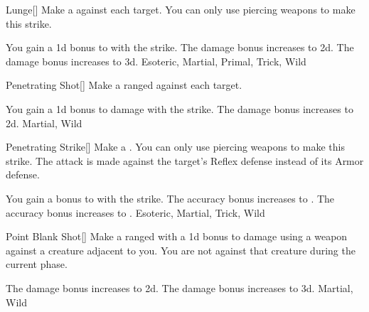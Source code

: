 \lowercase{\hypertarget{maneuver:Lunge}{}}\label{maneuver:Lunge}
\hypertarget{maneuver:Lunge}{}
\begin{freeability}[Rank 1]{Lunge}[]
Make a  against each target.
You can only use piercing weapons to make this strike.

\rankline
{} You gain a \plus1d bonus to  with the strike.
 The damage bonus increases to \plus2d.
 The damage bonus increases to \plus3d.
 Esoteric, Martial, Primal, Trick, Wild
\end{freeability}
\vspace{0.25em}



\lowercase{\hypertarget{maneuver:Penetrating Shot}{}}\label{maneuver:Penetrating Shot}
\hypertarget{maneuver:Penetrating Shot}{}
\begin{freeability}[Rank 4]{Penetrating Shot}[]
Make a ranged  against each target.

\rankline
{} You gain a \plus1d bonus to damage with the strike.
 The damage bonus increases to \plus2d.
 Martial, Wild
\end{freeability}
\vspace{0.25em}



\lowercase{\hypertarget{maneuver:Penetrating Strike}{}}\label{maneuver:Penetrating Strike}
\hypertarget{maneuver:Penetrating Strike}{}
\begin{freeability}[Rank 1]{Penetrating Strike}[]
Make a .
You can only use piercing weapons to make this strike.
The attack is made against the target's Reflex defense instead of its Armor defense.

\rankline
{} You gain a  bonus to  with the strike.
 The accuracy bonus increases to .
 The accuracy bonus increases to .
 Esoteric, Martial, Trick, Wild
\end{freeability}
\vspace{0.25em}



\lowercase{\hypertarget{maneuver:Point Blank Shot}{}}\label{maneuver:Point Blank Shot}
\hypertarget{maneuver:Point Blank Shot}{}
\begin{freeability}[Rank 3]{Point Blank Shot}[]
Make a ranged  with a \plus1d bonus to damage using a  weapon against a creature adjacent to you.
You are not  against that creature during the current phase.

\rankline
{} The damage bonus increases to \plus2d.
 The damage bonus increases to \plus3d.
 Martial, Wild
\end{freeability}
\vspace{0.25em}



